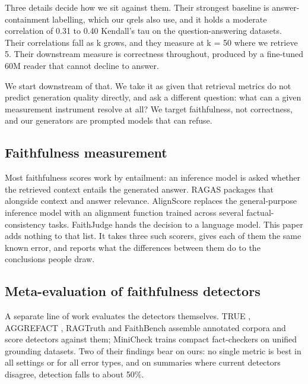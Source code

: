 \documentclass[11pt]{article}
\begin{document}
Three details decide how we sit against them. Their strongest baseline is answer-containment labelling, which our qrels also use, and it holds a moderate correlation of 0.31 to 0.40 Kendall's tau on the question-answering datasets. Their correlations fall as k grows, and they measure at k = 50 where we retrieve 5. Their downstream measure is correctness throughout, produced by a fine-tuned 60M reader that cannot decline to answer.

We start downstream of that. We take it as given that retrieval metrics do not predict generation quality directly, and ask a different question: what can a given measurement instrument resolve at all? We target faithfulness, not correctness, and our generators are prompted models that can refuse.


\subsection{Faithfulness measurement}
\label{sec:faith-measure}

Most faithfulness scores work by entailment: an inference model is asked whether the retrieved context entails the generated answer. RAGAS \citep{es-etal-2024} packages that alongside context and answer relevance. AlignScore \citep{zha-etal-2023} replaces the general-purpose inference model with an alignment function trained across several factual-consistency tasks. FaithJudge \citep{tamber-etal-2025} hands the decision to a language model. This paper adds nothing to that list. It takes three such scorers, gives each of them the same known error, and reports what the differences between them do to the conclusions people draw.


\subsection{Meta-evaluation of faithfulness detectors}
\label{sec:meta-eval}

A separate line of work evaluates the detectors themselves. TRUE \citep{honovich-etal-2022}, AGGREFACT \citep{tang-etal-2023}, RAGTruth \citep{niu-etal-2024} and FaithBench \citep{bao-etal-2025} assemble annotated corpora and score detectors against them; MiniCheck \citep{tang-etal-2024} trains compact fact-checkers on unified grounding datasets. Two of their findings bear on ours: no single metric is best in all settings or for all error types, and on summaries where current detectors disagree, detection falls to about 50\%.
\end{document}
